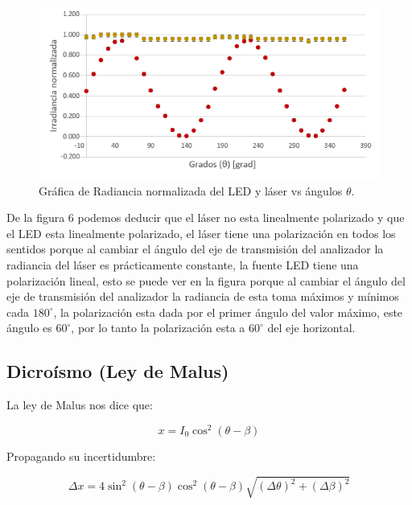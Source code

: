 \documentclass[DIV=calc, paper=a4, fontsize=10pt]{scrartcl}
\begin{document}
\begin{figure}[H]
    \centering
    \includegraphics{graficas/grafica 1.PNG}
    \caption{Gráfica de Radiancia normalizada del LED y láser vs ángulos $\theta$.}
    \label{fig:my_label}
\end{figure}

De la figura $6$ podemos deducir que el láser no esta linealmente polarizado y que el LED esta linealmente polarizado, el láser tiene una polarización en todos los sentidos porque al cambiar el ángulo del eje de transmisión del analizador la radiancia del láser es prácticamente constante, la fuente LED tiene una polarización lineal, esto se puede ver en la figura porque al cambiar el ángulo del eje de transmisión del analizador la radiancia de esta toma máximos y mínimos cada $180^{\circ}$, la polarización esta dada por el primer ángulo del valor máximo, este ángulo es $60^{\circ}$, por lo tanto la polarización esta a $60^{\circ}$ del eje horizontal.

\subsection*{\textcolor{carmine}{Dicroísmo (Ley de Malus)}}

La ley de Malus nos dice que:

\begin{equation*}
    x = I_{0} \cos^{2} (\theta - \beta)
\end{equation*}

Propagando su incertidumbre:

\begin{equation*}
    \Delta x = 4 \sin^{2}{(\theta  - \beta)} \cos^{2}{(\theta - \beta)}\sqrt{(\Delta \theta)^2 + (\Delta  \beta)^2}
\end{equation*}
\end{document}
